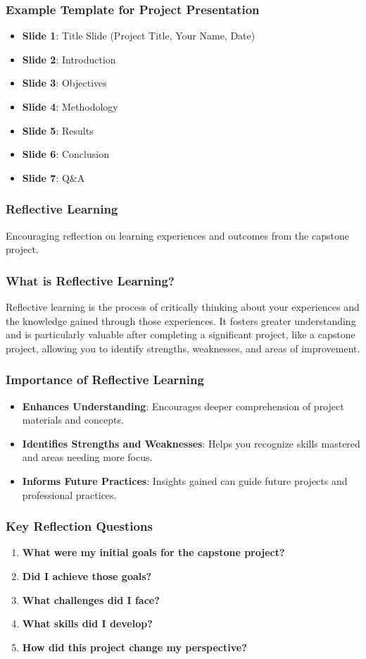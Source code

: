 \documentclass[aspectratio=169]{beamer}
\begin{document}
\begin{frame}[fragile]
    \frametitle{Example Template for Project Presentation}
    \begin{itemize}
        \item \textbf{Slide 1}: Title Slide (Project Title, Your Name, Date)
        \item \textbf{Slide 2}: Introduction
        \item \textbf{Slide 3}: Objectives
        \item \textbf{Slide 4}: Methodology
        \item \textbf{Slide 5}: Results
        \item \textbf{Slide 6}: Conclusion
        \item \textbf{Slide 7}: Q\&A
    \end{itemize}
\end{frame}

\begin{frame}[fragile]
    \frametitle{Reflective Learning}
    Encouraging reflection on learning experiences and outcomes from the capstone project.
\end{frame}

\begin{frame}[fragile]
    \frametitle{What is Reflective Learning?}
    Reflective learning is the process of critically thinking about your experiences and the knowledge gained through those experiences. It fosters greater understanding and is particularly valuable after completing a significant project, like a capstone project, allowing you to identify strengths, weaknesses, and areas of improvement.
\end{frame}

\begin{frame}[fragile]
    \frametitle{Importance of Reflective Learning}
    \begin{itemize}
        \item \textbf{Enhances Understanding}: Encourages deeper comprehension of project materials and concepts.
        \item \textbf{Identifies Strengths and Weaknesses}: Helps you recognize skills mastered and areas needing more focus.
        \item \textbf{Informs Future Practices}: Insights gained can guide future projects and professional practices.
    \end{itemize}
\end{frame}

\begin{frame}[fragile]
    \frametitle{Key Reflection Questions}
    \begin{enumerate}
        \item \textbf{What were my initial goals for the capstone project?}
        \item \textbf{Did I achieve those goals?}
        \item \textbf{What challenges did I face?}
        \item \textbf{What skills did I develop?}
        \item \textbf{How did this project change my perspective?}
    \end{enumerate}
\end{frame}
\end{document}
